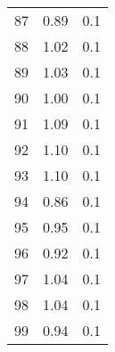 \begin{table}
\begin{tabular}{ccc}
87 & 0.89 & 0.1 \\
88 & 1.02 & 0.1 \\
89 & 1.03 & 0.1 \\
90 & 1.00 & 0.1 \\
91 & 1.09 & 0.1 \\
92 & 1.10 & 0.1 \\
93 & 1.10 & 0.1 \\
94 & 0.86 & 0.1 \\
95 & 0.95 & 0.1 \\
96 & 0.92 & 0.1 \\
97 & 1.04 & 0.1 \\
98 & 1.04 & 0.1 \\
99 & 0.94 & 0.1 \\
\end{tabular}
\end{table}
